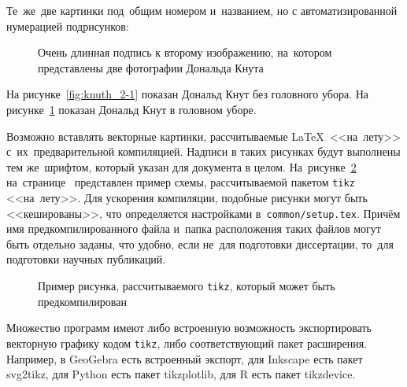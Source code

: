 Те~же~две картинки под~общим номером и~названием,
но с автоматизированной нумерацией подрисунков:
\begin{figure}[ht]
    \caption[Этот текст попадает в названия рисунков в списке рисунков]{Очень
        длинная подпись к второму изображению, на~котором представлены две
        фотографии Дональда Кнута}\label{fig:knuth_2}
\end{figure}

На рисунке~\cref{fig:knuth_2-1} показан Дональд Кнут без головного убора.
На рисунке~\cref{fig:knuth_2}
показан Дональд Кнут в головном уборе.

Возможно вставлять векторные картинки, рассчитываемые \LaTeX\ <<на~лету>>
с~их~предварительной компиляцией. Надписи в таких рисунках будут выполнены
тем же~шрифтом, который указан для документа в целом.
На~рисунке~\cref{fig:tikz_example} на~странице~\pageref{fig:tikz_example}
представлен пример схемы, рассчитываемой пакетом \verb|tikz| <<на~лету>>.
Для ускорения компиляции, подобные рисунки могут быть <<кешированы>>, что
определяется настройками в~\verb|common/setup.tex|.
Причём имя предкомпилированного
файла и~папка расположения таких файлов могут быть отдельно заданы,
что удобно, если не~для подготовки диссертации,
то~для подготовки научных публикаций.
\begin{figure}[ht]
    \legend{}
    \caption[Пример \texttt{tikz} схемы]{Пример рисунка, рассчитываемого
        \texttt{tikz}, который может быть предкомпилирован}\label{fig:tikz_example}
\end{figure}

Множество программ имеют либо встроенную возможность экспортировать векторную
графику кодом \verb|tikz|, либо соответствующий пакет расширения.
Например, в GeoGebra есть встроенный экспорт,
для Inkscape есть пакет svg2tikz,
для Python есть пакет tikzplotlib,
для R есть пакет tikzdevice.

